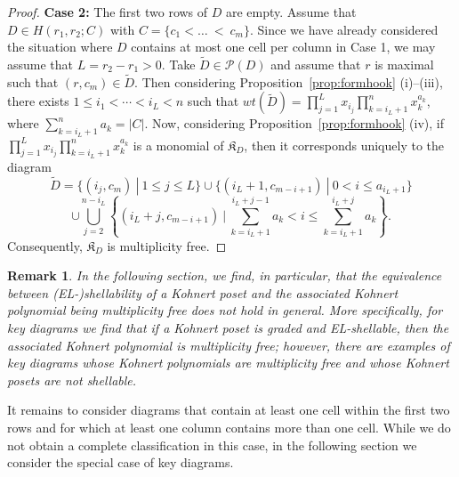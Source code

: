 \documentclass[letterpaper,10pt]{article}
\newtheorem{remark}[theorem]{Remark}
\begin{document}
\begin{proof}
    \noindent
    \textbf{Case 2:} The first two rows of $D$ are empty. Assume that $D\in H(r_1,r_2;C)$ with $C=\{c_1<\hdots~<~c_m\}$. Since we have already considered the situation where $D$ contains at most one cell per column in Case 1, we may assume that $L=r_2-r_1>0$. Take $\tilde{D}\in \mathcal{P}(D)$ and assume that $r$ is maximal such that $(r,c_m)\in \tilde{D}$. Then considering Proposition~\ref{prop:formhook} (i)--(iii), there exists $1\le i_1<\cdots<i_{L}< n$ such that $wt(\tilde{D})=\prod_{j=1}^Lx_{i_j}\prod_{k=i_L+1}^nx^{a_k}_k$, where $\sum_{k=i_L+1}^na_k=|C|$. Now, considering Proposition~\ref{prop:formhook} (iv), if $\prod_{j=1}^Lx_{i_j}\prod_{k=i_L+1}^nx^{a_k}_k$ is a monomial of $\mathfrak{K}_D$, then it  corresponds uniquely to the diagram $$\tilde{D}=\{(i_j,c_m)~|~1\le j\le L\}\cup\{(i_L+1,c_{m-i+1})~|~0< i\le a_{i_L+1}\}$$ $$\cup\bigcup_{j=2}^{n-i_L}\left\{(i_L+j,c_{m-i+1})~|~\sum_{k=i_L+1}^{i_L+j-1}a_k< i\le\sum_{k=i_L+1}^{i_L+j}a_k\right\}.$$ Consequently, $\mathfrak{K}_D$ is multiplicity free.
\end{proof}

\begin{remark}
    In the following section, we find, in particular, that the equivalence between \textup(EL-\textup)shellability of a Kohnert poset and the associated Kohnert polynomial being multiplicity free does not hold in general. More specifically, for key diagrams we find that if a Kohnert poset is graded and EL-shellable, then the associated Kohnert polynomial is multiplicity free; however, there are examples of key diagrams whose Kohnert polynomials are multiplicity free and whose Kohnert posets are not shellable.
\end{remark}

It remains to consider diagrams that contain at least one cell within the first two rows and for which at least one column contains more than one cell. While we do not obtain a complete classification in this case, in the following section we consider the special case of key diagrams.

\end{document}
